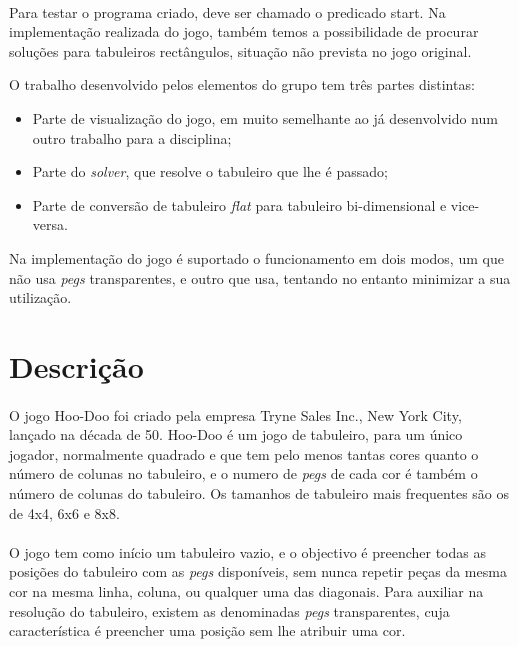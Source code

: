 \documentclass{llncs}
\begin{document}
\paragraph*{}
Para testar o programa criado, deve ser chamado o predicado start. Na implementação realizada do jogo, também temos a possibilidade de procurar soluções para tabuleiros rectângulos, situação não prevista no jogo original.
 
O trabalho desenvolvido pelos elementos do grupo tem tr\^{e}s partes distintas:
\begin{itemize}
\item Parte de visualiza\c{c}\~{a}o do jogo, em muito semelhante ao j\'{a} desenvolvido num outro trabalho para a disciplina;
\item Parte do \emph{solver}, que resolve o tabuleiro que lhe \'{e} passado;
\item Parte de convers\~{a}o de tabuleiro \emph{flat} para tabuleiro bi-dimensional e vice-versa.
\end{itemize}

Na implementa\c{c}\~{a}o do jogo \'{e} suportado o funcionamento em dois modos, um que n\~{a}o usa \emph{pegs} transparentes, e outro que usa, tentando no entanto minimizar a sua utiliza\c{c}\~{a}o.

%

\section{Descri\c{c}\~{a}o}
%
\paragraph*{}
O jogo Hoo-Doo foi criado pela empresa Tryne Sales Inc., New York City, lan\c{c}ado na d\'{e}cada de 50. Hoo-Doo \'{e} um jogo de tabuleiro, para um \'{u}nico jogador, normalmente quadrado e que tem pelo menos tantas cores quanto o n\'{u}mero de colunas no tabuleiro, e o numero de \emph{\emph{pegs}} de cada cor  é tamb\'{e}m o número de colunas do tabuleiro. Os tamanhos de tabuleiro mais frequentes s\~{a}o os de 4x4, 6x6 e 8x8.
\paragraph*{}O jogo tem como in\'{i}cio um tabuleiro vazio, e o objectivo \'{e} preencher todas as posi\c{c}\~{o}es do tabuleiro com as \emph{pegs} dispon\'{i}veis, sem nunca repetir pe\c{c}as da mesma cor na mesma linha, coluna, ou qualquer uma das diagonais. Para auxiliar na resolu\c{c}\~{a}o do tabuleiro, existem as denominadas \emph{pegs} transparentes, cuja caracter\'{i}stica \'{e} preencher uma posi\c{c}\~{a}o sem lhe atribuir uma cor.
\end{document}
